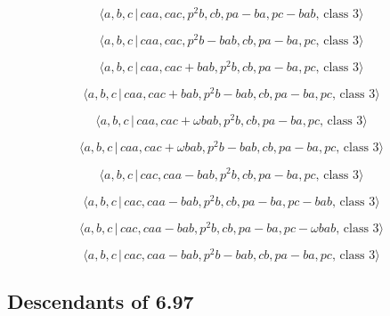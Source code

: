 \documentclass[10pt]{article}
\begin{document}
\begin{equation}
\langle a,b,c\,|\,caa,cac,p^2b,cb,pa-ba,pc-bab,\,\text{class }3\rangle 
\tag{7.2897}
\end{equation}

\begin{equation}
\langle a,b,c\,|\,caa,cac,p^2b-bab,cb,pa-ba,pc,\,\text{class }3\rangle 
\tag{7.2898}
\end{equation}

\begin{equation}
\langle a,b,c\,|\,caa,cac+bab,p^2b,cb,pa-ba,pc,\,\text{class }3\rangle 
\tag{7.2899}
\end{equation}

\begin{equation}
\langle a,b,c\,|\,caa,cac+bab,p^2b-bab,cb,pa-ba,pc,\,\text{class }3\rangle 
\tag{7.2900}
\end{equation}

\begin{equation}
\langle a,b,c\,|\,caa,cac+\omega bab,p^{2}b,cb,pa-ba,pc,\,\text{class }%
3\rangle  \tag{7.2901}
\end{equation}

\begin{equation}
\langle a,b,c\,|\,caa,cac+\omega bab,p^{2}b-bab,cb,pa-ba,pc,\,\text{class }%
3\rangle  \tag{7.2902}
\end{equation}

\begin{equation}
\langle a,b,c\,|\,cac,caa-bab,p^2b,cb,pa-ba,pc,\,\text{class }3\rangle 
\tag{7.2903}
\end{equation}

\begin{equation}
\langle a,b,c\,|\,cac,caa-bab,p^2b,cb,pa-ba,pc-bab,\,\text{class }3\rangle 
\tag{7.2904}
\end{equation}

\begin{equation}
\langle a,b,c\,|\,cac,caa-bab,p^{2}b,cb,pa-ba,pc-\omega bab,\,\text{class }%
3\rangle  \tag{7.2905}
\end{equation}

\begin{equation}
\langle a,b,c\,|\,cac,caa-bab,p^2b-bab,cb,pa-ba,pc,\,\text{class }3\rangle 
\tag{7.2906}
\end{equation}

\subsection{Descendants of 6.97}
\end{document}
